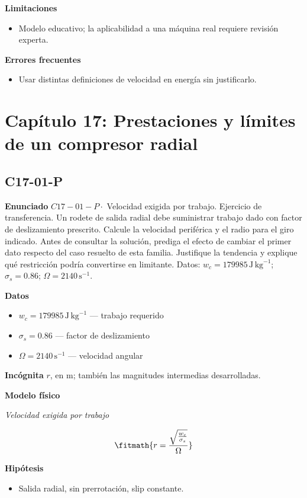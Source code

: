 \documentclass[10pt,openany]{book}
\begin{document}
\noindent\textbf{Limitaciones}
\begin{itemize}
\item Modelo educativo; la aplicabilidad a una máquina real requiere revisión experta.
\end{itemize}

\noindent\textbf{Errores frecuentes}
\begin{itemize}
\item Usar distintas definiciones de velocidad en energía sin justificarlo.
\end{itemize}
\section{Capítulo 17: Prestaciones y límites de un compresor radial}
\subsection*{C17-01-P}

\noindent\textbf{Enunciado}
\(C17-01-P \cdot\) Velocidad exigida por trabajo. Ejercicio de transferencia. Un rodete de salida radial debe suministrar trabajo dado con factor de deslizamiento prescrito. Calcule la velocidad periférica y el radio para el giro indicado. Antes de consultar la solución, prediga el efecto de cambiar el primer dato respecto del caso resuelto de esta familia. Justifique la tendencia y explique qué restricción podría convertirse en limitante. Datos: \(w_c=179985\, \mathrm{J}\,\mathrm{kg}^{-1}\); \(\sigma_s=0.86\); \(\Omega=2140\, \mathrm{s}^{-1}\).

\noindent\textbf{Datos}
\begin{itemize}
\item $w_c = 179985\,\mathrm{J}\,\mathrm{kg}^{-1}$ — trabajo requerido
\item $\sigma_s = 0.86$ — factor de deslizamiento
\item $\Omega = 2140\,\mathrm{s}^{-1}$ — velocidad angular
\end{itemize}

\noindent\textbf{Incógnita}
$r$, en $\mathrm{m}$; también las magnitudes intermedias desarrolladas.

\noindent\textbf{Modelo físico}

\noindent\textit{Velocidad exigida por trabajo}

\[
\fitmath{r=\frac{\sqrt{\frac{w_c}{\sigma_s}}}{\Omega}}
\]

\noindent\textbf{Hipótesis}
\begin{itemize}
\item Salida radial, sin prerrotación, slip constante.
\end{itemize}
\end{document}
